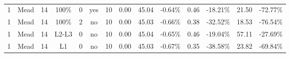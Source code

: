 \begin{table}[]
{\begin{tabular}{@{}cccccccrrrrrrr@{}}
1                    & Mead                 & 14                   & 100\%     & 0       & yes    & 10     & 0.00                     & 45.04                                    & -0.64\%                                 & 0.46                                     & -18.21\%                                 & 21.50                                     & -72.77\%                                 \\
1                    & Mead                 & 14                   & 100\%     & 2       & no     & 10     & 0.00                     & 45.03                                    & -0.66\%                                 & 0.38                                     & -32.52\%                                 & 18.53                                     & -76.54\%                                 \\
1                    & Mead                 & 14                   & L2-L3     & 0       & no     & 10     & 0.00                     & 45.04                                    & -0.65\%                                 & 0.46                                     & -19.04\%                                 & 57.11                                     & -27.69\%                                 \\
1                    & Mead                 & 14                   & L1        & 0       & no     & 10     & 0.00                     & 45.03                                    & -0.67\%                                 & 0.35                                     & -38.58\%                                 & 23.82                                     & -69.84\%                                 \\ \bottomrule
\end{tabular}}
\caption{}
\label{tab:my-table2}
\end{table}

